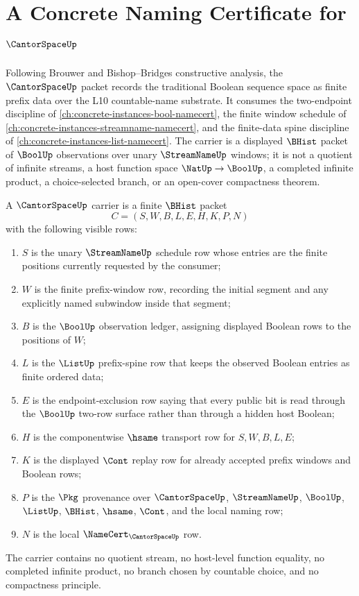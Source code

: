 \chapter{A Concrete Naming Certificate for $\CantorSpaceUp$}
\label{ch:concrete-instances-cantorspace-namecert}

Following Brouwer and Bishop--Bridges constructive analysis, the
$\CantorSpaceUp$ packet records the traditional Boolean sequence space as
finite prefix data over the L10 countable-name substrate. It consumes the
two-endpoint discipline of \autoref{ch:concrete-instances-bool-namecert}, the
finite window schedule of \autoref{ch:concrete-instances-streamname-namecert},
and the finite-data spine discipline of
\autoref{ch:concrete-instances-list-namecert}. The carrier is a displayed
$\BHist$ packet of $\BoolUp$ observations over unary $\StreamNameUp$ windows;
it is not a quotient of infinite streams, a host function space
$\NatUp \to \BoolUp$, a completed infinite product, a choice-selected branch,
or an open-cover compactness theorem.

\begin{definition}
\label{def:cantor-space-carrier}
A $\CantorSpaceUp$ carrier is a finite $\BHist$ packet
$$
C=(S,W,B,L,E,H,K,P,N)
$$
with the following visible rows:
\begin{enumerate}
\item $S$ is the unary $\StreamNameUp$ schedule row whose entries are the
finite positions currently requested by the consumer;
\item $W$ is the finite prefix-window row, recording the initial segment and
any explicitly named subwindow inside that segment;
\item $B$ is the $\BoolUp$ observation ledger, assigning displayed Boolean
rows to the positions of $W$;
\item $L$ is the $\ListUp$ prefix-spine row that keeps the observed Boolean
entries as finite ordered data;
\item $E$ is the endpoint-exclusion row saying that every public bit is read
through the $\BoolUp$ two-row surface rather than through a hidden host
Boolean;
\item $H$ is the componentwise $\hsame$ transport row for $S,W,B,L,E$;
\item $K$ is the displayed $\Cont$ replay row for already accepted prefix
windows and Boolean rows;
\item $P$ is the $\Pkg$ provenance over $\CantorSpaceUp$, $\StreamNameUp$,
$\BoolUp$, $\ListUp$, $\BHist$, $\hsame$, $\Cont$, and the local naming row;
\item $N$ is the local $\NameCert_{\CantorSpaceUp}$ row.
\end{enumerate}
The carrier contains no quotient stream, no host-level function equality, no
completed infinite product, no branch chosen by countable choice, and no
compactness principle.
\end{definition}

